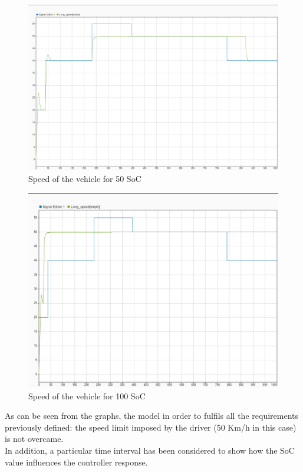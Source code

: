 \documentclass[12pt,a4paper]{report}
\begin{document}
\begin{figure}[htbp]
	\centering
	\includegraphics[scale=0.2]{50_soc.jpeg}
	\caption{Speed of the vehicle for 50 SoC}
\end{figure}

\begin{figure}[htbp]
	\centering
	\includegraphics[scale=0.28]{100_soc.jpeg}
	\caption{Speed of the vehicle for 100 SoC}
\end{figure}
\FloatBarrier
As can be seen from the graphs, the model in order to fulfils all the requirements previously defined: the speed limit imposed by the driver (50 Km/h in this case) is not overcame.\\
In addition, a particular time interval has been considered to show how the SoC value influences the controller response.\\
\FloatBarrier
\end{document}
